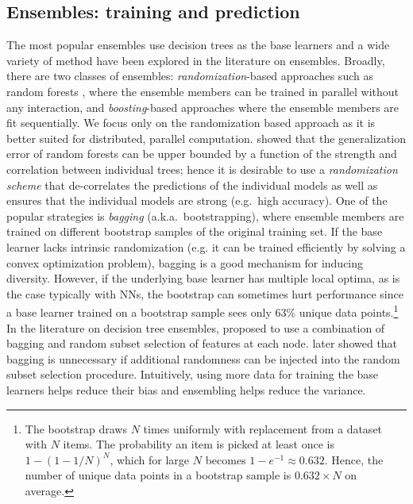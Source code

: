\documentclass{article}
\newcommand{\nn}{NNs}
\begin{document}
 


\subsection{Ensembles: training and prediction}
The most popular ensembles use decision trees as the base learners and a wide variety of method have been explored in the literature on ensembles. %
Broadly, there are two classes of ensembles: \emph{randomization}-based approaches such as random forests \citep{RF}, where the ensemble members can be trained in parallel without any interaction, and \emph{boosting}-based approaches where the ensemble members are fit sequentially. We focus only on the randomization based approach as it is better suited for distributed, parallel computation. \citet{RF} showed that the generalization error of random forests can be upper bounded by a function of the strength and correlation between individual trees; hence it is desirable to use a \emph{randomization scheme} that de-correlates the predictions of the individual models as well as ensures that the individual models are strong (e.g.~high accuracy). One of the popular strategies is \emph{bagging} (a.k.a.~bootstrapping), where  ensemble members are trained on different bootstrap samples of the original training set. If the base learner lacks intrinsic randomization (e.g. it can be trained efficiently by solving a convex optimization problem),  bagging is a good mechanism for inducing diversity. However, if the underlying base learner has multiple local optima, as is the case typically with \nn, the bootstrap can sometimes hurt performance since a base learner trained on a bootstrap sample sees only 63\% unique data points.\footnote{ The bootstrap draws $N$ times uniformly with replacement from a dataset with $N$ items. 
The probability an item is picked at least once is $1-(1-1/N)^N$, which for large $N$ becomes $1-e^{-1}\approx0.632$. Hence, the number of unique data points in a bootstrap sample is  $0.632\times N$ on average.}
In the literature on decision tree ensembles, \citet{RF} proposed to use a combination of bagging \citep{bagging} and random subset selection of features at each node. \citet{ERT} later showed that  bagging is unnecessary if additional randomness can be injected into the random subset selection procedure. Intuitively, using more data for training the base learners helps reduce their bias and ensembling helps reduce the variance.
\end{document}
